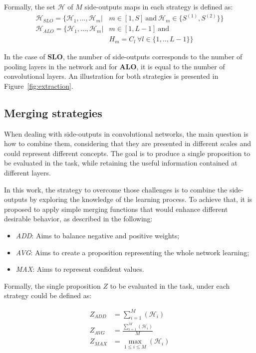 Formally, the set $\mathcal{H}$ of $M$ side-outputs maps in each strategy is defined as:
\small
\begin{align}
\mathcal{H}_{SLO}=\{\mathcal{H}_1,...,\mathcal{H}_m|& m\in[1,S]~\text{and}~\mathcal{H}_m \in\{S^{(1)},S^{(2)}\}\}\\
\mathcal{H}_{ALO}=\{\mathcal{H}_1,...,\mathcal{H}_m|& m\in[1,L-1]~\text{and}~\nonumber\\&{H}_m=C_l~\forall l \in \{1,..,L-1\}\}
\end{align}
\normalsize

In the case of \textbf{SLO}, the number of side-outputs corresponds to the number of pooling layers in the network and for \textbf{ALO}, it is equal to the number of convolutional layers. An illustration for both strategies is presented in Figure~\ref{fig:extraction}.

\subsection{Merging strategies}
 

When dealing with side-outputs in convolutional networks, the main question is how to combine them, considering that they are presented in different scales and could represent different concepts. The goal is to produce a single proposition to be evaluated in the task, while retaining the useful information contained at different layers.

In this work, the strategy to overcome those challenges is to combine the side-outputs by exploring the knowledge of the learning process. To achieve that, it is proposed to apply simple merging functions that would enhance different desirable behavior, as described in the following: 
\begin{itemize}
\item \textit{ADD}: Aims to balance negative and positive weights;
\item \textit{AVG}: Aims to create a proposition representing the whole network learning;  
\item \textit{MAX}: Aims to represent confident values. 
\end{itemize}  

Formally, the single proposition $Z$ to be evaluated in the task, under each strategy could be defined as:

\begin{align}
Z_{ADD} &= \sum_{i=1}^{M}(\mathcal{H}_i)\\
Z_{AVG} &= \frac{\sum_{i=1}^{M}(\mathcal{H}_i)}{M}\\
Z_{MAX} &= \max_{1 \leq i \leq M} (\mathcal{H}_i)
\end{align} 

